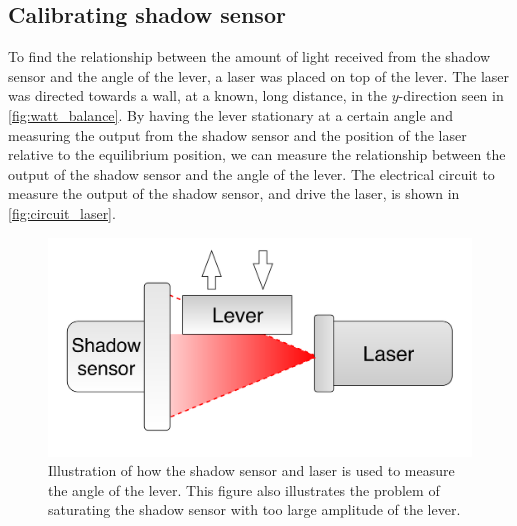 \documentclass[english,a4paper,12pt,reprint]{revtex4-1}
\begin{document}
\subsection{Calibrating shadow sensor}
To find the relationship between the amount of light received from the shadow sensor and the angle of the lever, a laser was placed on top of the lever. The laser was directed towards a wall, at a known, long distance, in the $y$-direction seen in \cref{fig:watt_balance}. By having the lever stationary at a certain angle and measuring the output from the shadow sensor and the position of the laser relative to the equilibrium position, we can measure the relationship between the output of the shadow sensor and the angle of the lever. The electrical circuit to measure the output of the shadow sensor, and drive the laser, is shown in \vref{fig:circuit_laser}.

\begin{figure}[h!]
  \centering
  \includegraphics[scale=0.21]{shadow_sensor.pdf}
  \caption{Illustration of how the shadow sensor and laser is used to measure the angle of the lever. This figure also illustrates the problem of saturating the shadow sensor with too large amplitude of the lever.}
  \label{fig:shadow_sens}
\end{figure}
\end{document}

